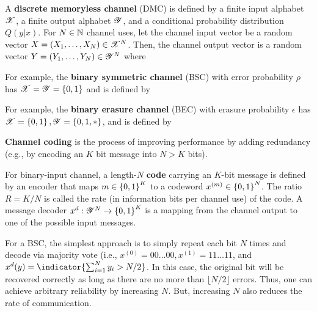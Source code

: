 \documentclass[letterpaper,10pt,english]{article}
\begin{document}
\begin{defn}
A \textbf{discrete memoryless channel} (DMC) is defined by a finite input alphabet $\mathscr{X}$, 
a finite output alphabet $\mathscr{Y}$, and a conditional probability distribution $Q(y|x)$. 
For $N \in \mathbb{N}$ channel uses, let the channel input vector be a random vector $X = (X_1, \dots, X_N) \in \mathscr{X}^N$. 
Then, the channel output vector is a random vector $Y = (Y_1, \dots,Y_N) \in \mathscr{Y}^N$ where 
\end{defn} 
\begin{shaded*}\begin{exmp}
For example, the \textbf{binary symmetric channel} (BSC) with error probability $\rho$ has $\mathscr{X} = \mathscr{Y} = \left\{0, 1\right\}$ and is defined by
\end{exmp}\end{shaded*} 
\begin{shaded*}\begin{exmp}
 For example, the \textbf{binary erasure channel} (BEC) with erasure probability $\epsilon$ has $\mathscr{X} = \left\{0,1\right\}, \mathscr{Y} =  \left\{0,1,\ast\right\}$, and is defined by 

\textbf{Channel coding} is the process of improving performance by adding redundancy (e.g., by encoding an $K$ bit message into $N > K$ bits).
\end{exmp}\end{shaded*} 
\begin{defn} 
For binary-input channel, a length-$N$ \textbf{code} carrying an $K$-bit message is defined by an encoder that maps $m \in \left\{0,1\right\}^K$ to a codeword $x^{(m)} \in \left\{0,1\right\}^N$. 
The ratio $R = K/N$ is called the rate (in information bits per channel use) of the code. 
A message decoder $x^d : \mathscr{Y}^N \to \left\{0,1\right\}^K$ is a mapping from the channel output to one of the possible input messages.
\end{defn} 
\begin{shaded*}\begin{exmp}
For a BSC, the simplest approach is to simply repeat each bit $N$ times and decode via majority vote (i.e., $x^{(0)} = 00 \dots 00, x^{(1)} = 11 \dots 11$, and $x^{d}(y) =\indicator{\sum_{i=1}^Ny_i > N/2}$. 
In this case, the original bit will be recovered correctly as long as there are no more than $\lfloor N/2\rfloor$ errors. 
Thus, one can achieve arbitrary reliability by increasing $N$. 
But, increasing $N$ also reduces the rate of communication.
\end{exmp}\end{shaded*} 
\end{document}
